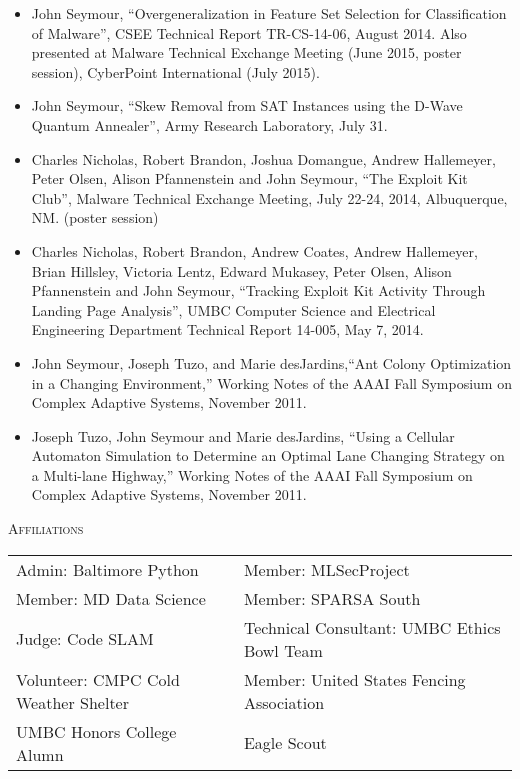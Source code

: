 \documentclass[a4paper, 11pt]{article}
\newenvironment{publications}
{\begin{itemize}
    \vspace{-4mm}
    \setlength{\itemsep}{1pt}
    \setlength{\itemindent}{0em}
    \setlength{\parskip}{0pt}
    \setlength{\parsep}{0pt}}
{\end{itemize}}
\begin{document}
\begin{publications}
\item John Seymour, ``Overgeneralization in Feature Set Selection for Classification of Malware'', CSEE Technical Report TR-CS-14-06, August 2014. Also presented at Malware Technical Exchange Meeting (June 2015, poster session), CyberPoint International (July 2015).
\item John Seymour, ``Skew Removal from SAT Instances using the D-Wave Quantum Annealer'', Army Research Laboratory, July 31.
\item Charles Nicholas, Robert Brandon, Joshua Domangue, Andrew Hallemeyer, Peter Olsen, Alison Pfannenstein and John Seymour, ``The Exploit Kit Club'', Malware Technical Exchange Meeting, July 22-24, 2014, Albuquerque, NM.  (poster session)
\item Charles Nicholas, Robert Brandon, Andrew Coates, Andrew Hallemeyer, Brian Hillsley, Victoria Lentz, Edward Mukasey, Peter Olsen, Alison Pfannenstein and John Seymour, ``Tracking Exploit Kit Activity Through Landing Page Analysis'', UMBC Computer Science and Electrical Engineering Department Technical Report 14-005, May 7, 2014.
\item John Seymour, Joseph Tuzo, and Marie desJardins,``Ant Colony Optimization in a Changing Environment,'' Working Notes of the AAAI Fall Symposium on Complex Adaptive Systems, November 2011.
\item Joseph Tuzo, John Seymour and Marie desJardins,  ``Using a Cellular Automaton Simulation to Determine an Optimal Lane Changing Strategy on a Multi-lane Highway,'' Working Notes of the AAAI Fall Symposium on Complex Adaptive Systems, November 2011.
\end{publications}

\medskip
\textsc{Affiliations}\\
\medskip
\begin{tabular}{l l}
Admin: Baltimore Python & Member: MLSecProject\\
Member: MD Data Science & Member: SPARSA South\\
Judge: Code SLAM &  Technical Consultant: UMBC Ethics Bowl Team\\
Volunteer: CMPC Cold Weather Shelter & Member: United States Fencing Association\\
UMBC Honors College Alumn & Eagle Scout\\
\end{tabular}
\end{document}
